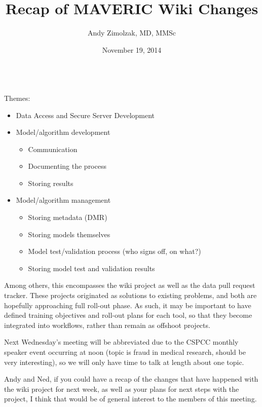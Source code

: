 \documentclass{tufte-handout}
\title{Recap of MAVERIC Wiki Changes}
\author{Andy Zimolzak, MD, MMSc}
\date{November 19, 2014}
\begin{document}
\maketitle

~\\


Themes:

\begin{itemize}
\item Data Access and Secure Server Development
\item Model/algorithm development

\begin{itemize}
\item Communication
\item Documenting the process
\item Storing results
\end{itemize}

\item Model/algorithm management

\begin{itemize}
\item Storing metadata (DMR)
\item Storing models themselves
\item Model test/validation process (who signs off, on what?)
\item Storing model test and validation results
\end{itemize}
\end{itemize}

Among others, this encompasses the wiki project as well as the data
pull request tracker. These projects originated as solutions to
existing problems, and both are hopefully approaching full roll-out
phase. As such, it may be important to have defined training
objectives and roll-out plans for each tool, so that they become
integrated into workflows, rather than remain as offshoot projects.
 
Next Wednesday's meeting will be abbreviated due to the CSPCC monthly
speaker event occurring at noon (topic is fraud in medical research,
should be very interesting), so we will only have time to talk at
length about one topic.
 
Andy and Ned, if you could have a recap of the changes that have
happened with the wiki project for next week, as well as your plans
for next steps with the project, I think that would be of general
interest to the members of this meeting.
 
\end{document}
